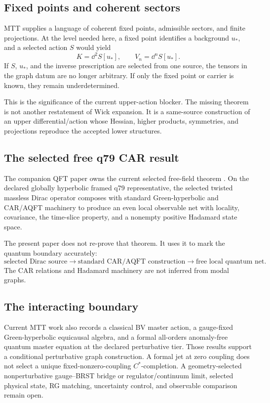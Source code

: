 \documentclass[11pt,a4paper]{article}
\begin{document}
\subsection{Fixed points and coherent sectors}

MTT supplies a language of coherent fixed points, admissible sectors, and
finite projections.  At the level needed here, a fixed point identifies a
background \(u_*\), and a selected action \(S\) would yield
\[
 K=\dd^2S[u_*],
 \qquad
 V_n=\dd^nS[u_*].
\]
If \(S\), \(u_*\), and the inverse prescription are selected from one
source, the tensors in the graph datum are no longer arbitrary.  If only
the fixed point or carrier is known, they remain underdetermined.

This is the significance of the current upper-action blocker.  The missing
theorem is not another restatement of Wick expansion.  It is a same-source
construction of an upper differential/action whose Hessian, higher
products, symmetries, and projections reproduce the accepted lower
structures.

\subsection{The selected free q79 CAR result}

The companion QFT paper owns the current selected free-field theorem
\cite{MTTQFT2026}.  On the declared globally hyperbolic framed q79
representative, the selected twisted massless Dirac operator composes with
standard Green-hyperbolic and CAR/AQFT machinery to produce an even local
observable net with locality, covariance, the time-slice property, and a
nonempty positive Hadamard state space.

The present paper does not re-prove that theorem.  It uses it to mark the
quantum boundary accurately:
\[
\text{selected Dirac source}
\longrightarrow
\text{standard CAR/AQFT construction}
\longrightarrow
\text{free local quantum net}.
\]
The CAR relations and Hadamard machinery are not inferred from modal
graphs.

\subsection{The interacting boundary}

Current MTT work also records a classical BV master action, a
gauge-fixed Green-hyperbolic equicausal algebra, and a formal all-orders
anomaly-free quantum master equation at the declared perturbative tier.
Those results support a conditional perturbative graph construction.  A
formal jet at zero coupling does not select a unique fixed-nonzero-coupling
\(C^*\)-completion.  A geometry-selected nonperturbative gauge--BRST
bridge or regulator/continuum limit, selected physical state, RG matching,
uncertainty control, and observable comparison remain open.
\end{document}
